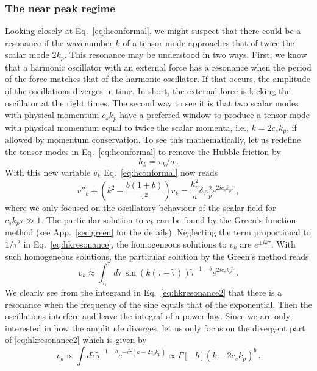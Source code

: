 \documentclass[a4paper,11pt]{article}
\numberwithin{equation}{section}
\begin{document}
\subsubsection{The near peak regime}
Looking closely at Eq.~\eqref{eq:hconformal}, we might suspect that there could be a resonance if the wavenumber $k$ of a tensor mode approaches that of twice the scalar mode $2k_p$. This resonance may be understood in two ways. First, we know that a harmonic oscillator with an external force has a resonance when the period of the force matches that of the harmonic oscillator. If that occurs, the amplitude of the oscillations diverges in time. In short, the external force is kicking the oscillator at the right times. The second way to see it is that two scalar modes with physical momentum $c_s k_p$ have a preferred window to produce a tensor mode with physical momentum equal to twice the scalar momenta, i.e., $k=2c_s k_p$, if allowed by momentum conservation. To see this mathematically, let us redefine the tensor modes in Eq.~\eqref{eq:hconformal} to remove the Hubble friction by
\begin{equation}\label{eq:hkv}
h_k=v_k/a\,.
\end{equation}
With this new variable $v_k$ Eq.~\eqref{eq:hconformal} now reads
\begin{equation}\label{eq:hkresonance}
v''_k+\left({k^2}-\frac{b(1+b)}{\tau^2}\right)v_k=\frac{k_p^2}{a}\delta\varphi_p^2{e^{2ic_sk_p\tau}}\,,
\end{equation}
where we only focused on the oscillatory behaviour of the scalar field for $c_sk_p\tau\gg1$. The particular solution to $v_k$ can be found by the Green's function method (see App.~\ref{sec:green} for the details).  Neglecting the term proportional to $1/\tau^2$ in Eq.~\eqref{eq:hkresonance}, the homogeneous solutions to $v_k$ are $e^{\pm ik\tau}$. With such homogeneous solutions, the particular solution by the Green's method reads
\begin{equation}\label{eq:hkresonance2}
v_k\approx\int_{\tau_i}^\tau d\tilde\tau\,\sin\left(k(\tau-\tilde\tau)\right)\tilde\tau^{-1-b}e^{2ic_sk_p\tilde\tau}\,.
\end{equation}
We clearly see from the integrand in Eq.~\eqref{eq:hkresonance2} that there is a resonance when the frequency of the sine equals that of the exponential. Then the oscillations interfere and leave the integral of a power-law. Since we are only interested in how the amplitude diverges, let us only focus on the divergent part of \eqref{eq:hkresonance2} which is given by
\begin{equation}\label{eq:hkresonance3}
v_k\propto\int d\tilde\tau\,\tilde\tau^{-1-b}e^{-i\tilde\tau(k-2c_sk_p)}\propto  \Gamma[-b](k-2c_sk_p)^{b}\,.
\end{equation}
\end{document}
